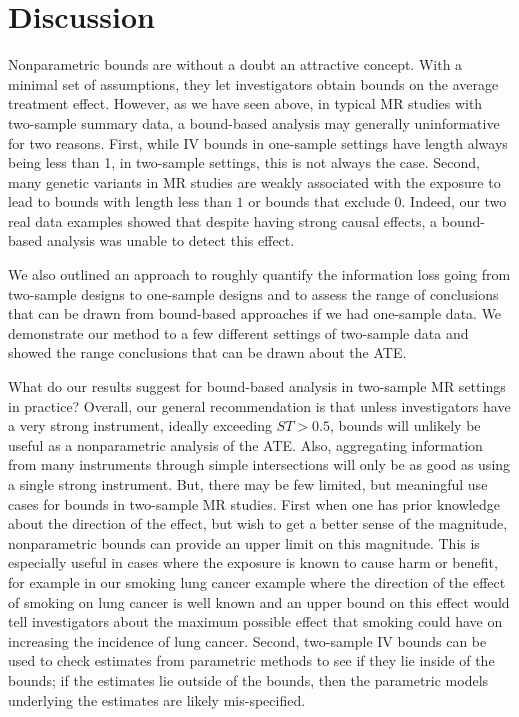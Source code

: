 \documentclass[
]{article}
\theoremstyle{plain}
\begin{document}
\hypertarget{discussion}{%
\section{\texorpdfstring{Discussion \label{conclusion-and-practical-considerations}}{Discussion }}\label{discussion}}

Nonparametric bounds are without a doubt an attractive concept. With a minimal set of assumptions, they let investigators obtain bounds on the average treatment effect. However, as we have seen above, in typical MR studies with two-sample summary data, a bound-based analysis may generally uninformative for two reasons. First, while IV bounds in one-sample settings have length always being less than 1, in two-sample settings, this is not always the case. Second, many genetic variants in MR studies are weakly associated with the exposure to lead to bounds with length less than \(1\) or bounds that exclude \(0\). Indeed, our two real data examples showed that despite having strong causal effects, a bound-based analysis was unable to detect this effect.

We also outlined an approach to roughly quantify the information loss going from two-sample designs to one-sample designs and to assess the range of conclusions that can be drawn from bound-based approaches if we had one-sample data. We demonstrate our method to a few different settings of two-sample data and showed the range conclusions that can be drawn about the ATE.

What do our results suggest for bound-based analysis in two-sample MR settings in practice? Overall, our general recommendation is that unless investigators have a very strong instrument, ideally exceeding \(ST >0.5\), bounds will unlikely be useful as a nonparametric analysis of the ATE. Also, aggregating information from many instruments through simple intersections will only be as good as using a single strong instrument. But, there may be few limited, but meaningful use cases for bounds in two-sample MR studies. First when one has prior knowledge about the direction of the effect, but wish to get a better sense of the magnitude, nonparametric bounds can provide an upper limit on this magnitude. This is especially useful in cases where the exposure is known to cause harm or benefit, for example in our smoking lung cancer example where the direction of the effect of smoking on lung cancer is well known and an upper bound on this effect would tell investigators about the maximum possible effect that smoking could have on increasing the incidence of lung cancer. Second, two-sample IV bounds can be used to check estimates from parametric methods to see if they lie inside of the bounds; if the estimates lie outside of the bounds, then the parametric models underlying the estimates are likely mis-specified.
\end{document}
